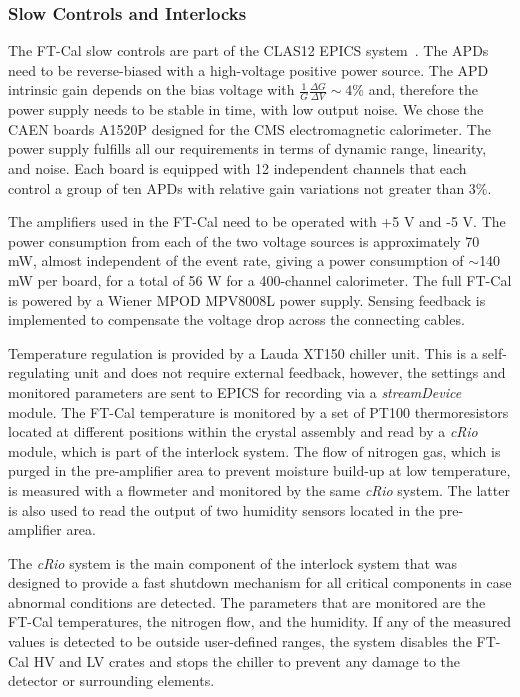\subsubsection{Slow Controls and Interlocks}
The FT-Cal slow controls are part of the CLAS12 EPICS system~\cite{daq}.
The APDs need to be reverse-biased
with a high-voltage positive power
source. The APD intrinsic
gain depends on the bias voltage with
$\frac{1}{G}\frac{\Delta G}{\Delta V} \sim4 \%$
and, therefore the power supply
needs to be stable in time, with low output
noise. We chose the CAEN boards A1520P designed
for the CMS electromagnetic
calorimeter. The power supply fulfills  all our requirements in
terms of dynamic range, linearity, and noise.
Each board is equipped with 12 independent
channels that each control a group of ten APDs
 with relative
gain variations not greater than 3$\%$.

The amplifiers used in the FT-Cal need to
be operated with +5 V and -5 V.
The power consumption from
each of the two voltage sources is approximately
70 mW, almost independent of the
event rate, giving a power consumption of
$\sim$140 mW per board, for a total of 56 W for
a 400-channel calorimeter. 
The full FT-Cal is powered by a Wiener
MPOD MPV8008L power supply.
Sensing feedback is implemented
to compensate the voltage drop across
the connecting cables.

Temperature regulation is provided by a
Lauda XT150 chiller unit. This is a self-regulating
unit and does not require external feedback,
however, the settings and monitored parameters are sent to EPICS for recording via a
{\it streamDevice} module.
The FT-Cal temperature is 
 monitored by a set of PT100 thermoresistors located at different positions within the crystal assembly and 
read by a {\it cRio} module, which is part of the interlock system. The flow of nitrogen gas, which is purged in the pre-amplifier area to prevent moisture build-up at low temperature, is measured with a flowmeter and monitored by the same {\it cRio} system. The latter is also used to read the output of two humidity sensors located in the pre-amplifier area. 

The {\it cRio} system is the main component of the interlock system that was designed to provide a fast shutdown mechanism for all critical components in case abnormal conditions are detected. The parameters that are monitored are the FT-Cal temperatures, the nitrogen flow, and the humidity. If any of the measured values is detected to be outside user-defined ranges, the system disables the FT-Cal HV and LV crates and stops the chiller to prevent any damage to the detector or surrounding elements.

